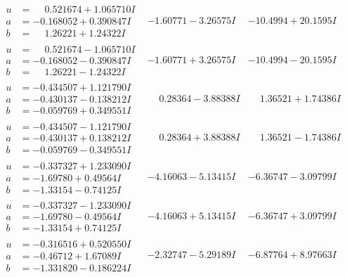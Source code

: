 \documentclass[1p]{elsarticle_modified}
\theoremstyle{definition}
\begin{document}
$$\begin{array}{c|c|c}
\begin{aligned}
u &= \phantom{-}0.521674 + 1.065710 I \\
a &= -0.168052 + 0.390847 I \\
b &= \phantom{-}1.26221 + 1.24322 I\end{aligned}
 & -1.60771 - 3.26575 I & -10.4994 + 20.1595 I \\ \hline\begin{aligned}
u &= \phantom{-}0.521674 - 1.065710 I \\
a &= -0.168052 - 0.390847 I \\
b &= \phantom{-}1.26221 - 1.24322 I\end{aligned}
 & -1.60771 + 3.26575 I & -10.4994 - 20.1595 I \\ \hline\begin{aligned}
u &= -0.434507 + 1.121790 I \\
a &= -0.430137 - 0.138212 I \\
b &= -0.059769 + 0.349551 I\end{aligned}
 & \phantom{-}0.28364 - 3.88388 I & \phantom{-}1.36521 + 1.74386 I \\ \hline\begin{aligned}
u &= -0.434507 - 1.121790 I \\
a &= -0.430137 + 0.138212 I \\
b &= -0.059769 - 0.349551 I\end{aligned}
 & \phantom{-}0.28364 + 3.88388 I & \phantom{-}1.36521 - 1.74386 I \\ \hline\begin{aligned}
u &= -0.337327 + 1.233090 I \\
a &= -1.69780 + 0.49564 I \\
b &= -1.33154 - 0.74125 I\end{aligned}
 & -4.16063 - 5.13415 I & -6.36747 - 3.09799 I \\ \hline\begin{aligned}
u &= -0.337327 - 1.233090 I \\
a &= -1.69780 - 0.49564 I \\
b &= -1.33154 + 0.74125 I\end{aligned}
 & -4.16063 + 5.13415 I & -6.36747 + 3.09799 I \\ \hline\begin{aligned}
u &= -0.316516 + 0.520550 I \\
a &= -0.46712 + 1.67089 I \\
b &= -1.331820 - 0.186224 I\end{aligned}
 & -2.32747 - 5.29189 I & -6.87764 + 8.97663 I \\ \hline\begin{aligned}

\end{aligned}
\end{array}$$
\end{document}
